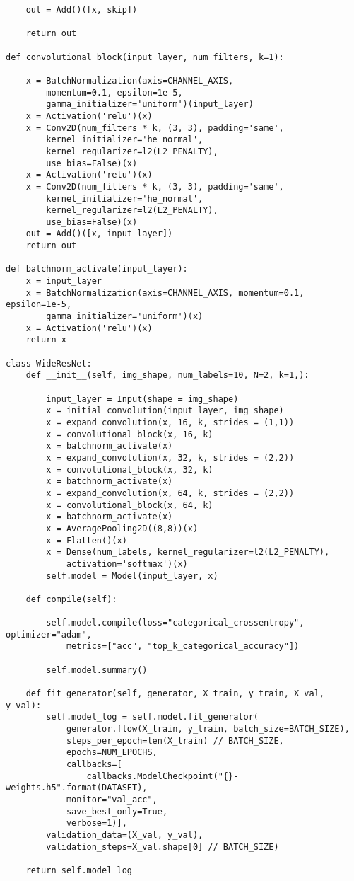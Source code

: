 \documentclass[12pt]{article}
\begin{document}
\begin{adjustwidth}{-50pt}{0pt}
\begin{Verbatim}
	out = Add()([x, skip])
	
	return out

def convolutional_block(input_layer, num_filters, k=1):

	x = BatchNormalization(axis=CHANNEL_AXIS,
		momentum=0.1, epsilon=1e-5,
		gamma_initializer='uniform')(input_layer)
	x = Activation('relu')(x)
	x = Conv2D(num_filters * k, (3, 3), padding='same',
		kernel_initializer='he_normal',
		kernel_regularizer=l2(L2_PENALTY),
		use_bias=False)(x)
	x = Activation('relu')(x)
	x = Conv2D(num_filters * k, (3, 3), padding='same',
		kernel_initializer='he_normal',
		kernel_regularizer=l2(L2_PENALTY),
		use_bias=False)(x)
	out = Add()([x, input_layer])
	return out

def batchnorm_activate(input_layer):    
	x = input_layer
	x = BatchNormalization(axis=CHANNEL_AXIS, momentum=0.1, epsilon=1e-5,
		gamma_initializer='uniform')(x)
	x = Activation('relu')(x)
	return x

class WideResNet:
	def __init__(self, img_shape, num_labels=10, N=2, k=1,):
		
		input_layer = Input(shape = img_shape)
		x = initial_convolution(input_layer, img_shape)
		x = expand_convolution(x, 16, k, strides = (1,1))
		x = convolutional_block(x, 16, k)
		x = batchnorm_activate(x)
		x = expand_convolution(x, 32, k, strides = (2,2))
		x = convolutional_block(x, 32, k)
		x = batchnorm_activate(x)
		x = expand_convolution(x, 64, k, strides = (2,2))
		x = convolutional_block(x, 64, k)
		x = batchnorm_activate(x)
		x = AveragePooling2D((8,8))(x)
		x = Flatten()(x)
		x = Dense(num_labels, kernel_regularizer=l2(L2_PENALTY),
			activation='softmax')(x)
		self.model = Model(input_layer, x)

	def compile(self):
	
		self.model.compile(loss="categorical_crossentropy", optimizer="adam",
			metrics=["acc", "top_k_categorical_accuracy"])

		self.model.summary()

	def fit_generator(self, generator, X_train, y_train, X_val, y_val):
		self.model_log = self.model.fit_generator(
			generator.flow(X_train, y_train, batch_size=BATCH_SIZE),
			steps_per_epoch=len(X_train) // BATCH_SIZE,
			epochs=NUM_EPOCHS,
			callbacks=[
				callbacks.ModelCheckpoint("{}-weights.h5".format(DATASET),
			monitor="val_acc",
			save_best_only=True,
			verbose=1)],
		validation_data=(X_val, y_val),
		validation_steps=X_val.shape[0] // BATCH_SIZE)
	
	return self.model_log



\end{Verbatim}
\end{adjustwidth}
\end{document}
